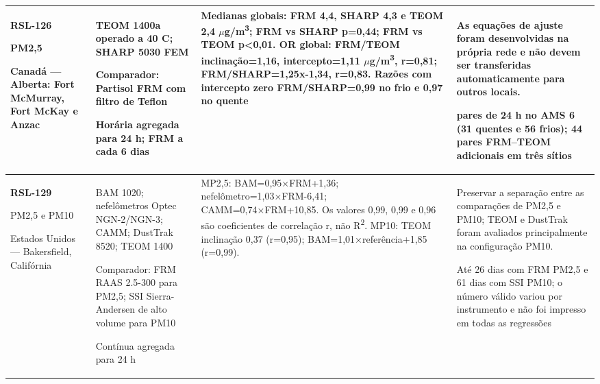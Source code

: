 \begin{longtable}{|P{0.18\textwidth}|P{0.25\textwidth}|P{0.28\textwidth}|P{\arrayrulewidth\relax}|}
\textbf{RSL-126}\par\textcite{rsl126}\par PM2,5\par Canadá --- Alberta: Fort McMurray, Fort McKay e Anzac & TEOM 1400a operado a 40 \textdegree{}C; SHARP 5030 FEM\par\medskip Comparador: Partisol FRM com filtro de Teflon\par\medskip Horária agregada para 24 h; FRM a cada 6 dias & Medianas globais: FRM 4,4, SHARP 4,3 e TEOM 2,4 \ensuremath{\mu}g/m\textsuperscript{3}; FRM vs SHARP p=0,44; FRM vs TEOM p<0,01. OR global: FRM/TEOM inclinação=1,16, intercepto=1,11 \ensuremath{\mu}g/m\textsuperscript{3}, r=0,81; FRM/SHARP=1,25x-1,34, r=0,83. Razões com intercepto zero FRM/SHARP=0,99 no frio e 0,97 no quente & As equações de ajuste foram desenvolvidas na própria rede e não devem ser transferidas automaticamente para outros locais.\par{} pares de 24 h no AMS 6 (31 quentes e 56 frios); 44 pares FRM--TEOM adicionais em três sítios\\\hline
\textbf{RSL-129}\par\textcite{rsl129}\par PM2,5 e PM10\par Estados Unidos --- Bakersfield, Califórnia & BAM 1020; nefelômetros Optec NGN-2/NGN-3; CAMM; DustTrak 8520; TEOM 1400\par\medskip Comparador: FRM RAAS 2.5-300 para PM2,5; SSI Sierra-Andersen de alto volume para PM10\par\medskip Contínua agregada para 24 h & MP2,5: BAM=0,95×FRM+1,36; nefelômetro=1,03×FRM-6,41; CAMM=0,74×FRM+10,85. Os valores 0,99, 0,99 e 0,96 são coeficientes de correlação r, não R\textsuperscript{2}. MP10: TEOM inclinação 0,37 (r=0,95); BAM=1,01×referência+1,85 (r=0,99). & Preservar a separação entre as comparações de PM2,5 e PM10; TEOM e DustTrak foram avaliados principalmente na configuração PM10.\par\medskip Até 26 dias com FRM PM2,5 e 61 dias com SSI PM10; o número válido variou por instrumento e não foi impresso em todas as regressões\\\hline

\end{longtable}
